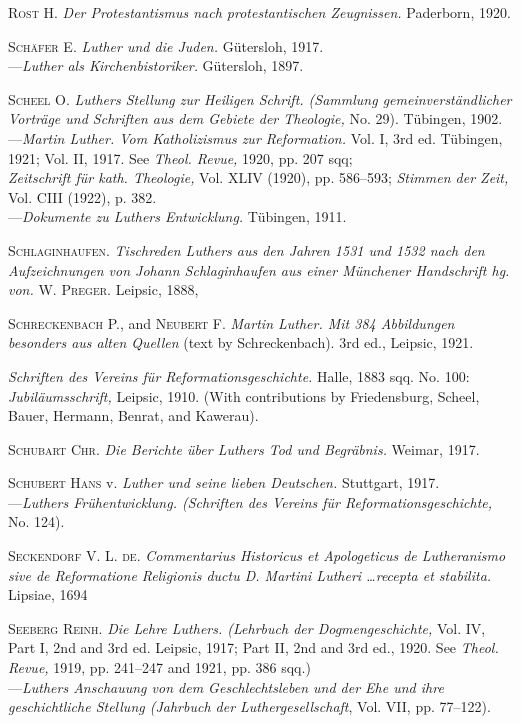 \textsc{Rost H.} \textit{Der Protestantismus nach protestantischen Zeugnissen.} Paderborn,
1920.

\textsc{Schäfer E.} \textit{Luther und die Juden.} Gütersloh, 1917. \\
---\textit{Luther als Kirchenbistoriker.} Gütersloh, 1897.

\textsc{Scheel O.} \textit{Luthers Stellung zur Heiligen Schrift. (Sammlung gemeinverständlicher Vorträge und Schriften aus dem Gebiete der Theologie,} No.
29). Tübingen, 1902. \\
---\textit{Martin Luther. Vom Katholizismus zur Reformation.} Vol. I, 3rd ed.
Tübingen, 1921; Vol. II, 1917. See \textit{Theol. Revue,} 1920, pp. 207 sqq; \\
\textit{Zeitschrift für kath. Theologie,} Vol. XLIV (1920), pp. 586--593; \textit{Stimmen
der Zeit,} Vol. CIII (1922), p. 382. \\
---\textit{Dokumente zu Luthers Entwicklung.} Tübingen, 1911.

\textsc{Schlaginhaufen.} \textit{Tischreden Luthers aus den Jahren 1531 und 1532 nach
den Aufzeichnungen von Johann Schlaginhaufen aus einer Münchener
Handschrift hg. von.} \textsc{W. Preger.} Leipsic, 1888,

\textsc{Schreckenbach P.}, and \textsc{Neubert F.} \textit{Martin Luther. Mit 384 Abbildungen
besonders aus alten Quellen} (text by Schreckenbach). 3rd ed., Leipsic,
1921.

\textit{Schriften des Vereins für Reformationsgeschichte.} Halle, 1883 sqq. No. 100:
\textit{Jubiläumsschrift,} Leipsic, 1910. (With contributions by Friedensburg,
Scheel, Bauer, Hermann, Benrat, and Kawerau).

\textsc{Schubart Chr.} \textit{Die Berichte über Luthers Tod und Begräbnis.} Weimar,
1917.

\textsc{Schubert Hans} v. \textit{Luther und seine lieben Deutschen.} Stuttgart, 1917. \\
---\textit{Luthers Frühentwicklung. (Schriften des Vereins für Reformationsgeschichte,} No. 124).

\textsc{Seckendorf V. L. de.} \textit{Commentarius Historicus et Apologeticus de Lutheranismo sive de Reformatione Religionis ductu D. Martini
Lutheri \dots recepta et stabilita.} Lipsiae, 1694

\textsc{Seeberg Reinh.} \textit{Die Lehre Luthers. (Lehrbuch der Dogmengeschichte,} Vol.
IV, Part I, 2nd and 3rd ed. Leipsic, 1917; Part II, 2nd and 3rd ed., 1920.
See \textit{Theol. Revue,} 1919, pp. 241--247 and 1921, pp. 386 sqq.) \\
---\textit{Luthers Anschauung von dem Geschlechtsleben und der Ehe und ihre
geschichtliche Stellung (Jahrbuch der Luthergesellschaft}, Vol. VII, pp.
77--122).

